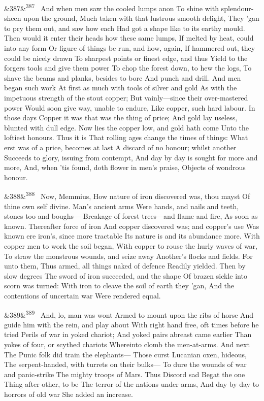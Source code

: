 \documentclass[12pt]{article}
\newcommand{\para}[1][]{\par\noindent\ifx&#1&\else\textsuperscript{\footnotesize #1}~\fi}
\begin{document}
\para[387] And when men saw the cooled lumps anon To shine with splendour-sheen upon the ground, Much taken with that lustrous smooth delight, They 'gan to pry them out, and saw how each Had got a shape like to its earthy mould. Then would it enter their heads how these same lumps, If melted by heat, could into any form Or figure of things be run, and how, again, If hammered out, they could be nicely drawn To sharpest points or finest edge, and thus Yield to the forgers tools and give them power To chop the forest down, to hew the logs, To shave the beams and planks, besides to bore And punch and drill. And men began such work At first as much with tools of silver and gold As with the impetuous strength of the stout copper; But vainly---since their over-mastered power Would soon give way, unable to endure, Like copper, such hard labour. In those days Copper it was that was the thing of price; And gold lay useless, blunted with dull edge. Now lies the copper low, and gold hath come Unto the loftiest honours. Thus it is That rolling ages change the times of things: What erst was of a price, becomes at last A discard of no honour; whilst another Succeeds to glory, issuing from contempt, And day by day is sought for more and more, And, when 'tis found, doth flower in men's praise, Objects of wondrous honour.

\para[388] Now, Memmius, How nature of iron discovered was, thou mayst Of thine own self divine. Man's ancient arms Were hands, and nails and teeth, stones too and boughs--- Breakage of forest trees---and flame and fire, As soon as known. Thereafter force of iron And copper discovered was; and copper's use Was known ere iron's, since more tractable Its nature is and its abundance more. With copper men to work the soil began, With copper to rouse the hurly waves of war, To straw the monstrous wounds, and seize away Another's flocks and fields. For unto them, Thus armed, all things naked of defence Readily yielded. Then by slow degrees The sword of iron succeeded, and the shape Of brazen sickle into scorn was turned: With iron to cleave the soil of earth they 'gan, And the contentions of uncertain war Were rendered equal.

\para[389] And, lo, man was wont Armed to mount upon the ribs of horse And guide him with the rein, and play about With right hand free, oft times before he tried Perils of war in yoked chariot; And yoked pairs abreast came earlier Than yokes of four, or scythed chariots Whereinto clomb the men-at-arms. And next The Punic folk did train the elephants--- Those curst Lucanian oxen, hideous, The serpent-handed, with turrets on their bulks--- To dure the wounds of war and panic-strike The mighty troops of Mars. Thus Discord sad Begat the one Thing after other, to be The terror of the nations under arms, And day by day to horrors of old war She added an increase.
\end{document}
